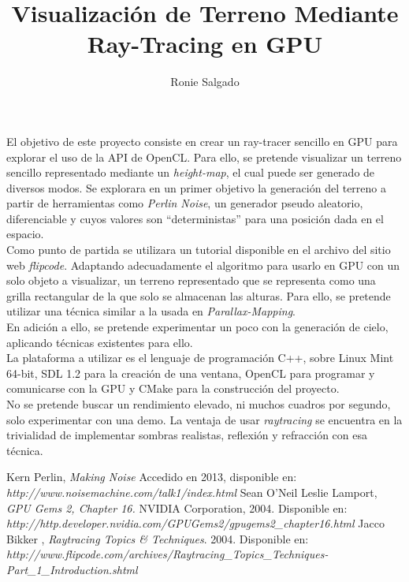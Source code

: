 \documentclass{article}
\begin{document}
\title{Visualización de Terreno Mediante Ray-Tracing en GPU}
\author{Ronie Salgado}
\date{}

\maketitle

El objetivo de este proyecto consiste en crear un ray-tracer sencillo en GPU
para explorar el uso de la API de OpenCL. Para ello, se pretende visualizar
un terreno sencillo representado mediante un {\it height-map}, el cual puede
ser generado de diversos modos. Se explorara en un primer objetivo la generación
del terreno a partir de herramientas como {\it Perlin Noise}\cite{perlin}, un generador
pseudo aleatorio, diferenciable y cuyos valores son ``deterministas'' para una 
posición dada en el espacio. \\

Como punto de partida se utilizara un tutorial disponible en el archivo del
sitio web {\it flipcode}\cite{raytrace}. Adaptando adecuadamente el algoritmo para
usarlo en GPU con un solo objeto a visualizar, un terreno representado que se
representa como una grilla rectangular de la que solo se almacenan las alturas.
Para ello, se pretende utilizar una técnica similar a la usada en
{\it Parallax-Mapping}. \\

En adición a ello, se pretende experimentar un poco con la generación de cielo,
aplicando técnicas existentes para ello\cite{gpugems}. \\

La plataforma a utilizar es el lenguaje de programación C++, sobre Linux Mint
64-bit, SDL 1.2 para la creación de una ventana, OpenCL para programar y
comunicarse con la GPU y CMake para la construcción del proyecto. \\

No se pretende buscar un rendimiento elevado, ni muchos cuadros por segundo,
solo experimentar con una demo. La ventaja de usar {\it raytracing} se encuentra
en la trivialidad de implementar sombras realistas, reflexión y refracción con
esa técnica.


\begin{thebibliography}{9}

 Kern Perlin, \emph{Making Noise} Accedido en 2013, disponible en:
         {\it http://www.noisemachine.com/talk1/index.html}
  Sean O'Neil Leslie Lamport, \emph{GPU Gems 2, Chapter 16.} NVIDIA Corporation, 2004.
        Disponible en: {\it http://http.developer.nvidia.com/GPUGems2/gpugems2\_chapter16.html}
 Jacco Bikker , \emph{Raytracing Topics \& Techniques}. 2004. Disponible en: {\it http://www.flipcode.com/archives/Raytracing\_Topics\_Techniques-Part\_1\_Introduction.shtml}
\end{thebibliography}
\end{document}
